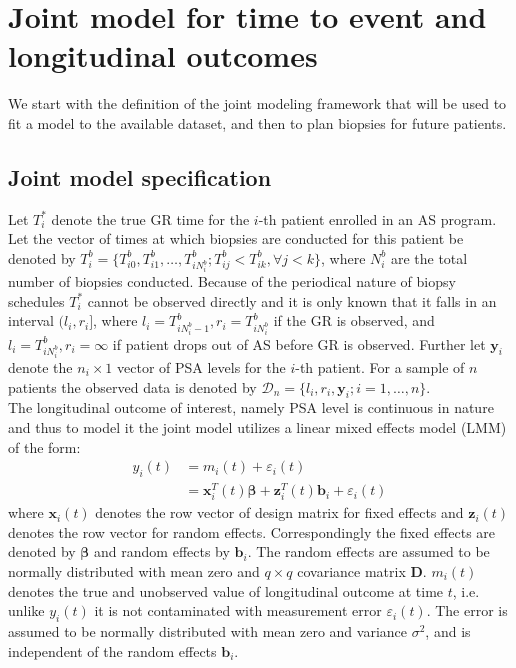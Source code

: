
\section{Joint model for time to event and longitudinal outcomes}
\label{sec : jm_framework}
We start with the definition of the joint modeling framework that will be used to fit a model to the available dataset, and then to plan biopsies for future patients.

\subsection{Joint model specification}
\label{subsec : jm_specification}
Let $T_i^*$ denote the true GR time for the $i$-th patient enrolled in an AS program. Let the vector of times at which biopsies are conducted for this patient be denoted by $T_i^b = \{T^b_{i0}, T^b_{i1}, \ldots, T^b_{i{N_i^b}}; T^b_{ij} < T^b_{ik}, \forall j<k\}$, where $N_i^b$ are the total number of biopsies conducted. Because of the periodical nature of biopsy schedules $T_i^*$ cannot be observed directly and it is only known that it falls in an interval $(l_i, r_i]$, where $l_i = T^b_{i{N_i^b - 1}}, r_i = T^b_{i{N_i^b}}$ if the GR is observed, and $l_i = T^b_{i{N_i^b}}, r_i=\infty$ if patient drops out of AS before GR is observed. Further let $\boldsymbol{y}_i$ denote the $n_i \times 1$  vector of PSA levels for the $i$-th patient. For a sample of $n$ patients the observed data is denoted by $\mathcal{D}_n = \{l_i, r_i, \boldsymbol{y}_i; i = 1, \ldots, n\}$.\\

The longitudinal outcome of interest, namely PSA level is continuous in nature and thus to model it the joint model utilizes a linear mixed effects model (LMM) of the form:
\begin{equation*}
\begin{split}
y_i(t) &= m_i(t) + \varepsilon_i(t)\\
&=\boldsymbol{x}_i^T(t) \boldsymbol{\beta} + \boldsymbol{z}_i^T(t) \boldsymbol{b}_i + \varepsilon_i(t)
\end{split}
\end{equation*}
where $\boldsymbol{x}_i(t)$ denotes the row vector of design matrix for fixed effects and $\boldsymbol{z}_i(t)$ denotes the row vector for random effects. Correspondingly the fixed effects are denoted by $\boldsymbol{\beta}$ and random effects by $\boldsymbol{b}_i$. The random effects are assumed to be normally distributed with mean zero and $q \times q$ covariance matrix $\boldsymbol{D}$. $m_i(t)$ denotes the true and unobserved value of longitudinal outcome at time $t$, i.e. unlike $y_i(t)$ it is not contaminated with measurement error $\varepsilon_i(t)$. The error is assumed to be normally distributed with mean zero and variance $\sigma^2$, and is independent of the random effects $\boldsymbol{b}_i$.\\

